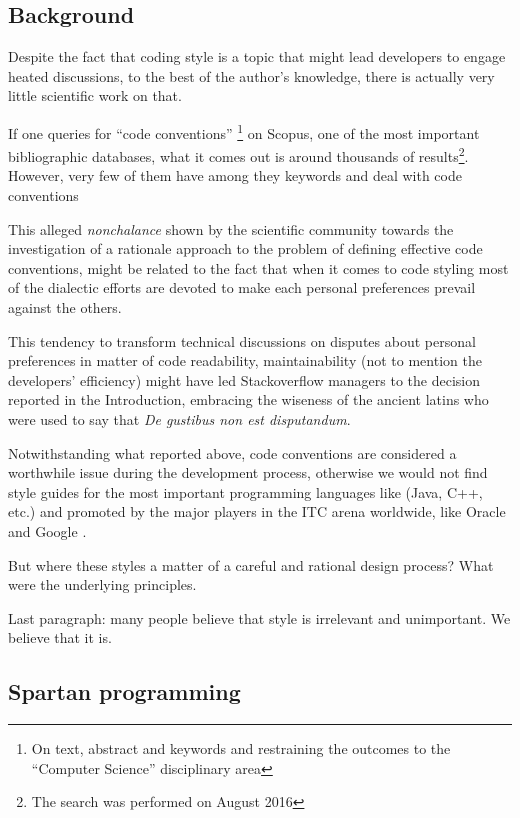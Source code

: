 \subsection{Background}

Despite the fact that coding style is a topic that might lead developers to engage heated 
discussions, to the best of the author's knowledge, there is actually very little scientific 
work on that. 

If one queries for ``code conventions''
\footnote{On text, abstract and keywords and restraining the outcomes to the ``Computer Science''
disciplinary area} 
on Scopus, one of the most important bibliographic databases, what it comes out is around 
thousands of results\footnote{The search was performed on August 2016}. 
However, very few of them  have  among they
keywords and deal with code conventions

This alleged \emph{nonchalance} shown by the scientific community towards the investigation 
of a rationale approach to the problem of defining effective code conventions, might be 
related to the fact that when it comes to code styling most of the dialectic efforts are devoted
to make each personal preferences prevail against the others.

This tendency to transform technical discussions on disputes about personal preferences 
in matter of code readability, maintainability (not to mention the developers' efficiency) might 
have led Stackoverflow managers to the decision reported in the Introduction, embracing the 
wiseness of the ancient latins who were used to say that \emph{De gustibus non est disputandum}.

Notwithstanding what reported above, code conventions are considered a worthwhile issue during 
the development process, otherwise we would not find style guides for the most important 
programming languages like (Java, C++, etc.) and promoted by the major players in 
the ITC arena worldwide, like Oracle and Google \cite{}. 

But where these styles a matter of a careful and rational design process?
What were the underlying principles.

Last paragraph: many people believe that style is irrelevant and unimportant.
We believe that it is.

\subsection{Spartan programming}

